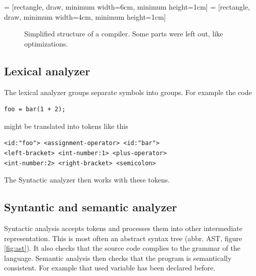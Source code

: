  = [rectangle, draw, minimum width=6cm, minimum height=1cm] 
 = [rectangle, draw, minimum width=4cm, minimum height=1cm] 
\begin{figure}\label{fig:compiler-structure}
    {\centering
    \par}
    \caption{Simplified structure of a compiler. Some parts were left out, like
    optimizations.}
    \label{fig:compiler_tikz}
\end{figure}

\subsection{Lexical analyzer}
The lexical analyzer groups separate symbols into groups. For example the code
\begin{verbatim}
foo = bar(1 + 2);
\end{verbatim}
might be translated into tokens like this
\begin{lstlisting}[stringstyle=\color{black}]
<id:"foo"> <assignment-operator> <id:"bar"> 
<left-bracket> <int-number:1> <plus-operator> 
<int-number:2> <right-bracket> <semicolon>
\end{lstlisting}
The Syntactic analyzer then works with these tokens.

\subsection{Syntantic and semantic analyzer}
Syntactic analysis accepts tokens and processes them into other intermediate
representation. This is most often an abstract syntax tree (abbr. AST, figure
\ref{fig:ast}). It also checks that the source code complies to the grammar of
the language. Semantic analysis then checks that the program is semantically
consistent. For example that used variable has been declared before.

